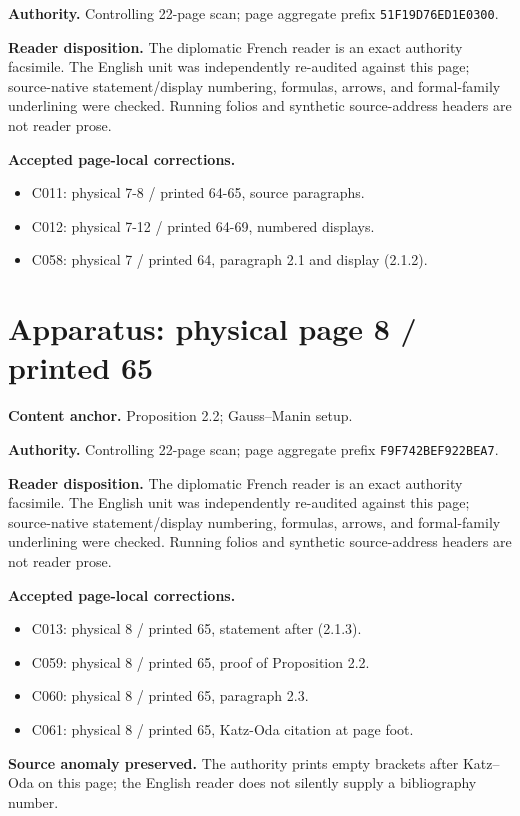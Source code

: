 \documentclass[10pt]{article}
\begin{document}
\textbf{Authority.} Controlling 22-page scan; page aggregate prefix \texttt{51F19D76ED1E0300}.

\textbf{Reader disposition.} The diplomatic French reader is an exact authority facsimile. The English unit was independently re-audited against this page; source-native statement/display numbering, formulas, arrows, and formal-family underlining were checked. Running folios and synthetic source-address headers are not reader prose.

\textbf{Accepted page-local corrections.} \begin{itemize}
\item C011: physical 7-8 / printed 64-65, source paragraphs.
\item C012: physical 7-12 / printed 64-69, numbered displays.
\item C058: physical 7 / printed 64, paragraph 2.1 and display (2.1.2).
\end{itemize}
\newpage
\setcounter{footnote}{0}
\fontsize{10.2pt}{12.04pt}\selectfont
\section*{Apparatus: physical page 8 / printed 65}
\textbf{Content anchor.} Proposition 2.2; Gauss--Manin setup.

\textbf{Authority.} Controlling 22-page scan; page aggregate prefix \texttt{F9F742BEF922BEA7}.

\textbf{Reader disposition.} The diplomatic French reader is an exact authority facsimile. The English unit was independently re-audited against this page; source-native statement/display numbering, formulas, arrows, and formal-family underlining were checked. Running folios and synthetic source-address headers are not reader prose.

\textbf{Accepted page-local corrections.} \begin{itemize}
\item C013: physical 8 / printed 65, statement after (2.1.3).
\item C059: physical 8 / printed 65, proof of Proposition 2.2.
\item C060: physical 8 / printed 65, paragraph 2.3.
\item C061: physical 8 / printed 65, Katz-Oda citation at page foot.
\end{itemize}


\textbf{Source anomaly preserved.} The authority prints empty brackets after Katz--Oda on this page; the English reader does not silently supply a bibliography number.
\newpage
\setcounter{footnote}{0}
\fontsize{10.2pt}{12.04pt}\selectfont
\end{document}
